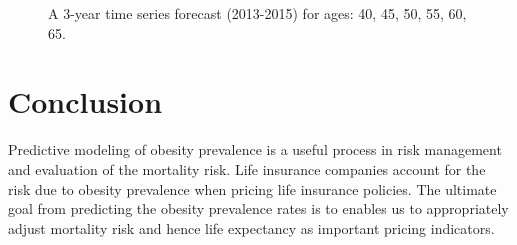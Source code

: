 \documentclass[11pt,letterpaper]{article}
\numberwithin{equation}{section}
\begin{document}


\begin{figure}
\begin{center}
{}
{}
{}
{}
{}
{}
\caption{\label{fig:f12} A 3-year time series forecast (2013-2015) for ages: 40, 45, 50, 55, 60, 65. }
\end{center}
\end{figure}


\newpage
\section{Conclusion}\label{sec:conclusion}
 Predictive modeling of obesity prevalence is a useful process in risk management and evaluation of the mortality risk. Life insurance companies account for the risk due to obesity prevalence when pricing life insurance policies. The ultimate goal from predicting the obesity prevalence rates is to enables us to appropriately adjust mortality risk and hence life expectancy as important pricing indicators.
\end{document}
